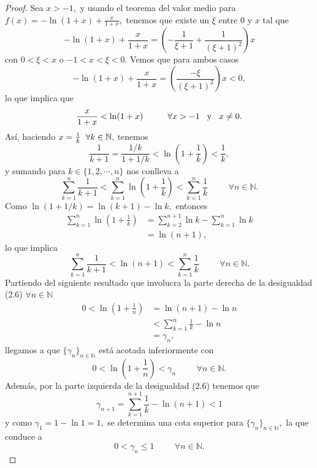 \begin{proof}
	Sea $x > -1,$ y usando el teorema del valor medio para $f(x) = -\ln (1+x)+\frac{x}{1+x},$ tenemos que existe un $\xi$ entre $0$ y $x$ tal que $$-\ln (1+x)+\frac{x}{1+x} = \left(-\frac{1}{\xi+1}+\frac{1}{(\xi+1)^2}\right)x$$ con $0 < \xi < x$ o $-1 < x < \xi < 0.$ Vemos que para ambos casos $$-\ln (1+x)+\frac{x}{1+x} = \left(\frac{-\xi}{(\xi+1)^2}\right)x < 0,$$ lo que implica que $$\frac{x}{1+x}<\ln (1+x)\hspace{1cm}\forall x > -1\hspace{0.3cm} \textrm{y}\hspace{0.3cm} x \neq 0.$$
	Así, haciendo $x = \tfrac{1}{k}\hspace{0.2cm}\forall k \in \mathbb{N},$ tenemos
	\begin{equation}
	\frac{1}{k+1} = \frac{1/k}{1+1/k} < \ln \left(1+\frac{1}{k}\right) < \frac{1}{k},
	\end{equation}
	y sumando para $k \in \{1,2,\cdots,n\}$ nos conlleva a $$\sum_{k = 1}^{n}\frac{1}{k+1} < \sum_{k = 1}^{n}\ln \left(1+\frac{1}{k}\right) < \sum_{k = 1}^{n}\frac{1}{k}\hspace{1cm}\forall n \in \mathbb{N}.$$
	Como $\ln (1+1/k) = \ln(k+1)-\ln k,$ entonces
	\begin{align*}
	\sum_{k = 1}^{n}\ln \left(1+\frac{1}{k}\right) &= \sum_{k = 2}^{n+1}\ln k-\sum_{k = 1}^{n}\ln k\\
	&= \ln (n+1),
	\end{align*}
	lo que implica
	\begin{equation}
	\sum_{k = 1}^{n}\frac{1}{k+1} < \ln (n+1) < \sum_{k = 1}^{n}\frac{1}{k}\hspace{1cm}\forall n \in \mathbb{N}.
	\end{equation}
	Partiendo del siguiente resultado que involucra la parte derecha de la desigualdad (2.6) $\forall n \in \mathbb{N}$
	\begin{align*}
	0 < \ln \left(1+\frac{1}{n}\right) &= \ln (n+1)-\ln n\\
	&< \sum_{k = 1}^{n}\frac{1}{k}-\ln n\\
	&= \gamma_n,
	\end{align*}
	llegamos a que $\{\gamma_n\}_{n \in \mathbb{N}}$ está acotada inferiormente con $$0 < \ln \left(1+\frac{1}{n}\right) < \gamma_n\hspace{1cm}\forall n \in \mathbb{N}.$$
	Además, por la parte izquierda de la desigualdad (2.6) tenemos que$$\gamma_{n+1} = \sum_{k = 1}^{n+1}\frac{1}{k}-\ln (n+1) < 1$$
	y como $\gamma_1 = 1-\ln 1 = 1,$ se determina una cota superior para $\{\gamma_n\}_{n \in \mathbb{N}},$ la que conduce a $$0 < \gamma_n \leq 1\hspace{1cm}\forall n \in \mathbb{N}.$$

\end{proof}
